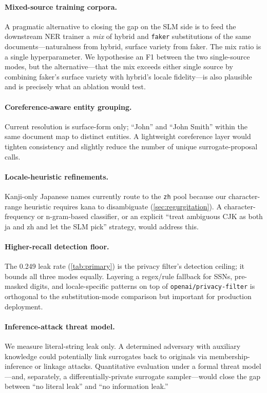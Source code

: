 \documentclass[11pt]{article}
\newcommand{\code}[1]{\texttt{#1}}
\newcommand{\openaipf}{\code{openai/privacy-filter}}
\newcommand{\faker}{\code{faker}}
\begin{document}
\paragraph{Mixed-source training corpora.}
A pragmatic alternative to closing the gap on the SLM side is to feed
the downstream NER trainer a \emph{mix} of hybrid and \faker{}
substitutions of the same documents---naturalness from hybrid, surface
variety from faker. The mix ratio is a single hyperparameter. We
hypothesise an F1 between the two single-source modes, but the
alternative---that the mix exceeds either single source by combining
faker's surface variety with hybrid's locale fidelity---is also
plausible and is precisely what an ablation would test.

\paragraph{Coreference-aware entity grouping.}
Current resolution is surface-form only; ``John'' and ``John Smith''
within the same document map to distinct entities. A lightweight
coreference layer would tighten consistency and slightly reduce the
number of unique surrogate-proposal calls.

\paragraph{Locale-heuristic refinements.}
Kanji-only Japanese names currently route to the \code{zh} pool
because our character-range heuristic requires kana to disambiguate
(\cref{sec:regurgitation}). A character-frequency or n-gram-based
classifier, or an explicit ``treat ambiguous CJK as both ja and zh and
let the SLM pick'' strategy, would address this.

\paragraph{Higher-recall detection floor.}
The 0.249 leak rate (\cref{tab:primary}) is the privacy filter's
detection ceiling; it bounds all three modes equally. Layering a
regex/rule fallback for SSNs, pre-masked digits, and locale-specific
patterns on top of \openaipf{} is orthogonal to the substitution-mode
comparison but important for production deployment.

\paragraph{Inference-attack threat model.}
We measure literal-string leak only. A determined adversary with
auxiliary knowledge could potentially link surrogates back to
originals via membership-inference or linkage attacks. Quantitative
evaluation under a formal threat model---and, separately, a
differentially-private surrogate sampler---would close the gap between
``no literal leak'' and ``no information leak.''
\end{document}
